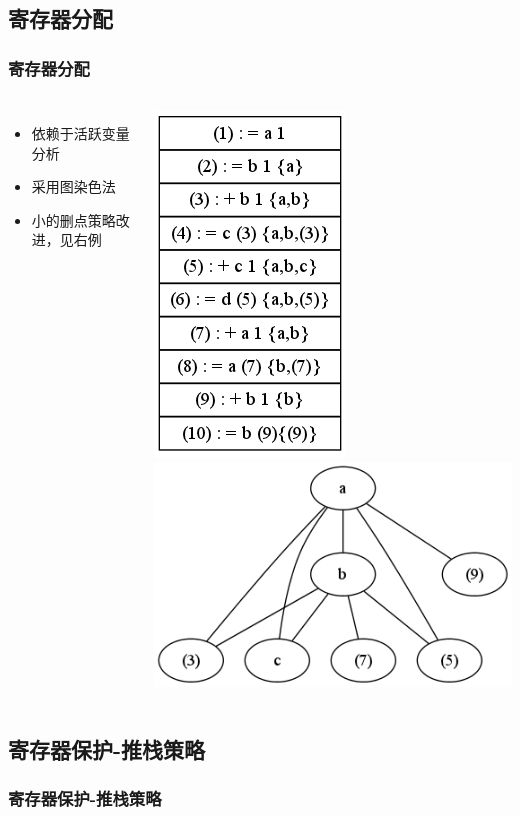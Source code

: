 \documentclass{beamer}
\begin{document}
\subsection{寄存器分配}
\begin{frame}
	\frametitle{寄存器分配}
	\begin{columns}
	\begin{itemize}
		\item 依赖于活跃变量分析
		\item 采用图染色法
		\item 小的删点策略改进，见右例
	\end{itemize}
	\includegraphics[scale=0.3]{register_allocation_triple.png}
	\includegraphics[scale=0.3]{interference_graph.png}
	\end{columns}
\end{frame}
\subsection{寄存器保护-推栈策略}
\begin{frame}
	\frametitle{寄存器保护-推栈策略}
\end{frame}
\end{document}

